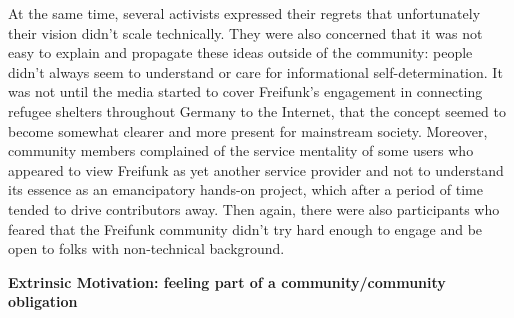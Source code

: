 At the same time, several activists expressed their regrets that unfortunately their vision didn't scale technically.
They were also concerned that it was not easy to explain and propagate these ideas outside of the community: people didn't always seem to understand or care for informational self-determination.
It was not until the media started to cover Freifunk's engagement in connecting refugee shelters throughout Germany to the Internet, that the concept seemed to become somewhat clearer and more present for mainstream society.
Moreover, community members complained of the service mentality of some users who appeared to view Freifunk as yet another service provider and not to understand its essence as an emancipatory hands-on project, which after a period of time tended to drive contributors away.
Then again, there were also participants who feared that the Freifunk community didn't try hard enough to engage and be open to folks with non-technical background.

\begin{comment}
Although net neutrality is one of the key principles in the Pico-Peering-Agreement, the minimal consensus paper/document(?) for all Freifunk communities/free network projects, not all of the survey participants interpreted the notion the same way, nor did they grant it equal importance.
\end{comment}


\textbf{Extrinsic Motivation: feeling part of a community/community obligation}

